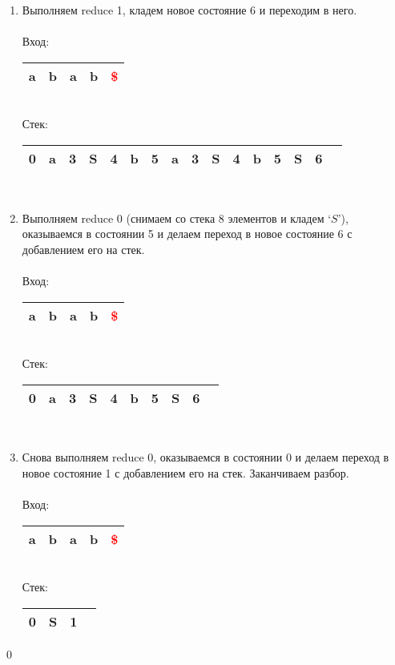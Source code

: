 \begin{example}
\begin{enumerate}
\begin{tabular}[c]{ |c|c|c|c|c|c|c|c|c|c|c|c|c|c }
\end{tabular}
\\
\item Выполняем reduce 1, кладем новое состояние 6 и переходим в него. \\ \\
Вход: \,
\begin{tabular}[c]{ |c|c|c|c|c| }
    \hline a & b & a & b & \textcolor{red}{\$} \\ \hline
\end{tabular} \\
Стек: \,
\begin{tabular}[c]{ |c|c|c|c|c|c|c|c|c|c|c|c|c|c|c|c }
    \hline 0 & a & 3 & S & 4 & b & 5 & a & 3 & S & 4 & b & 5 & S & 6 & \\ \hline
\end{tabular}
\\
\item Выполняем reduce 0 (снимаем со стека 8 элементов и кладем `$S$'), оказываемся в состоянии 5 и делаем переход в новое состояние 6 с добавлением его на стек. \\ \\
Вход: \,
\begin{tabular}[c]{ |c|c|c|c|c| }
    \hline a & b & a & b & \textcolor{red}{\$} \\ \hline
\end{tabular}\\
Стек: \,
\begin{tabular}[c]{ |c|c|c|c|c|c|c|c|c|c }
    \hline 0 & a & 3 & S & 4 & b & 5 & S & 6 & \\ \hline
\end{tabular}
\\
\item Снова выполняем reduce 0, оказываемся в состоянии 0 и делаем переход в новое состояние 1 с добавлением его на стек. Заканчиваем разбор. \\ \\
Вход: \,
\begin{tabular}[c]{ |c|c|c|c|c| }
    \hline a & b & a & b & \textcolor{red}{\$} \\ \hline
\end{tabular} \\
Стек: \,
\begin{tabular}[c]{ |c|c|c|c }
    \hline 0 & S & 1 & \\ \hline
\end{tabular}
\end{enumerate}
\qed
\end{example}

